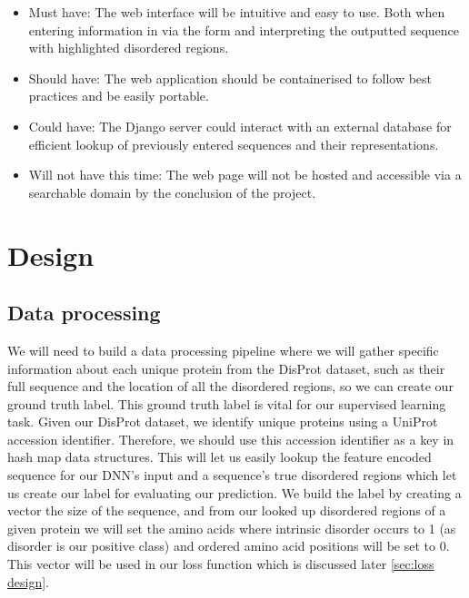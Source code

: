 \documentclass{l4proj}
\begin{document}
\begin{itemize}    
    \item Must have: The web interface will be intuitive and easy to use. Both when entering information in via the form and interpreting the outputted sequence with highlighted disordered regions.
    \item Should have: The web application should be containerised to follow best practices and be easily portable.
    \item Could have: The Django server could interact with an external database for efficient lookup of previously entered sequences and their representations.
    \item Will not have this time: The web page will not be hosted and accessible via a searchable domain by the conclusion of the project.
\end{itemize}



\chapter{Design}
\label{chap:design}

\section{Data processing}

We will need to build a data processing pipeline where we will gather specific information about each unique protein from the DisProt dataset, such as their full sequence and the location of all the disordered regions, so we can create our ground truth label. This ground truth label is vital for our supervised learning task. Given our DisProt dataset, we identify unique proteins using a UniProt accession identifier. Therefore, we should use this accession identifier as a key in hash map data structures. This will let us easily lookup the feature encoded sequence for our DNN's input and a sequence’s true disordered regions which let us create our label for evaluating our prediction. We build the label by creating a vector the size of the sequence, and from our looked up disordered regions of a given protein we will set the amino acids where intrinsic disorder occurs to 1 (as disorder is our positive class) and ordered amino acid positions will be set to 0. This vector will be used in our loss function which is discussed later \ref{sec:loss design}. 
\end{document}
